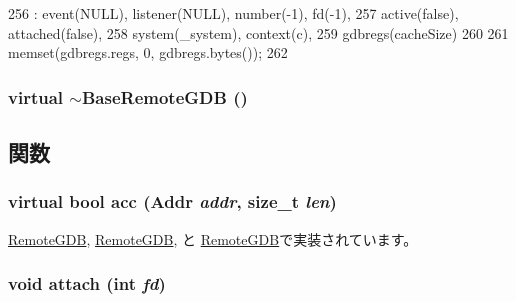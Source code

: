 \begin{DoxyCode}
256     : event(NULL), listener(NULL), number(-1), fd(-1),
257       active(false), attached(false),
258       system(_system), context(c),
259       gdbregs(cacheSize)
260 {
261     memset(gdbregs.regs, 0, gdbregs.bytes());
262 }
\end{DoxyCode}
\hypertarget{classBaseRemoteGDB_a8d9c4468359ca2d976af78ac0c15c0ec}{
\subsubsection[{$\sim$BaseRemoteGDB}]{\setlength{\rightskip}{0pt plus 5cm}virtual $\sim${\bf BaseRemoteGDB} ()}}
\label{classBaseRemoteGDB_a8d9c4468359ca2d976af78ac0c15c0ec}


\subsection{関数}
\hypertarget{classBaseRemoteGDB_ac0968a34e271b194ce3e808a2252d6a3}{
\subsubsection[{acc}]{\setlength{\rightskip}{0pt plus 5cm}virtual bool acc ({\bf Addr} {\em addr}, \/  size\_\-t {\em len})}}
\label{classBaseRemoteGDB_ac0968a34e271b194ce3e808a2252d6a3}


\hyperlink{classPowerISA_1_1RemoteGDB_a07d679884d7893090266b44c9a1520cb}{RemoteGDB}, \hyperlink{classSparcISA_1_1RemoteGDB_ac4c7be164f087f2f53d137d9768809a7}{RemoteGDB}, と \hyperlink{classX86ISA_1_1RemoteGDB_ac4c7be164f087f2f53d137d9768809a7}{RemoteGDB}で実装されています。\hypertarget{classBaseRemoteGDB_a9b8a915c2058dbc784c223ff9b93f1a5}{
\subsubsection[{attach}]{\setlength{\rightskip}{0pt plus 5cm}void attach (int {\em fd})}}
\label{classBaseRemoteGDB_a9b8a915c2058dbc784c223ff9b93f1a5}



